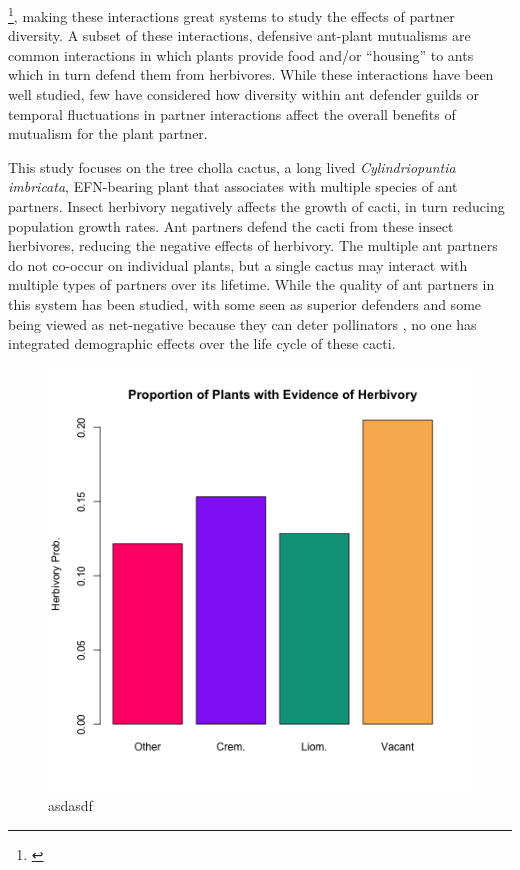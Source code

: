 \documentclass[12pt,a4paper]{article}
\newcommand{\ali}[2]{{\color{pink}{#1}}\footnote{\textit{\color{pink}{#2}}}}
\begin{document}
\ali{Ant visitation to extra-floral nectar producing plants are a classic and well-studied example of interspecific mutualisms which are often multispecies and have dynamic turnover patterns}{... Is this a better transition? I tried to tie it in a bit more conceptually.}, making these interactions great systems to study the effects of partner diversity.
A subset of these interactions, defensive ant-plant mutualisms are common interactions in which plants provide food and/or ``housing'' to ants which in turn defend them from herbivores\cite{Bronstein1998, Bronstein2006}. 
While these interactions have been well studied\cite{Ness2006,Beattie1985,Schultheiss2022}, few have considered how diversity within ant defender guilds\cite{Stanton2013} or temporal fluctuations in partner interactions\cite{Trøjelsgaard2015} affect the overall benefits of mutualism for the plant partner.

This study focuses on the tree cholla cactus, a long lived \textit{Cylindriopuntia imbricata}, EFN-bearing plant that associates with multiple species of ant partners.
Insect herbivory negatively affects the growth of cacti, in turn reducing population growth rates\cite{Miller2009}. 
Ant partners defend the cacti from these insect herbivores, reducing the negative effects of herbivory\cite{Miller2007}. 
The multiple ant partners do not co-occur on individual plants, but a single cactus may interact with multiple types of partners over its lifetime.
While the quality of ant partners in this system has been studied, with some seen as superior defenders and some  being viewed as net-negative because they can deter pollinators \cite{Ohm2014}, no one has integrated demographic effects over the life cycle of these cacti.


\begin{figure}[h]
	\includegraphics[width=.8\linewidth]{herb_ant_only_flow.png}
	\caption{asdasdf}
	\label{fig:herb}
\end{figure}
\end{document}
